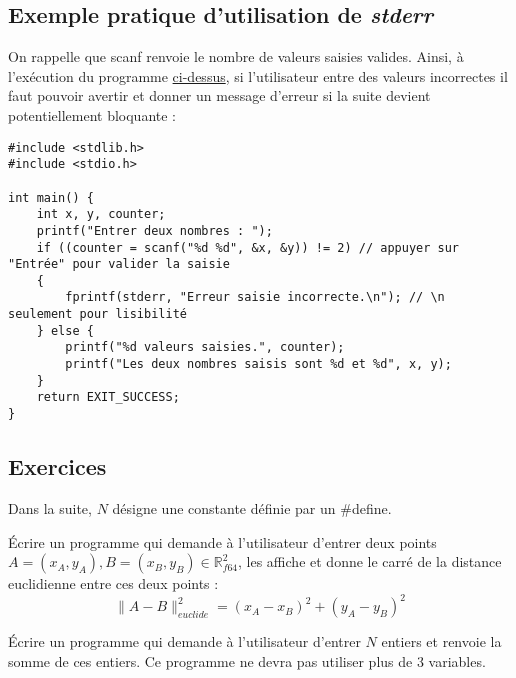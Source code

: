 \documentclass[../../../main.tex]{subfiles}
\begin{document}
\subsection{Exemple pratique d'utilisation de \textit{stderr}}
On rappelle que \textsf{scanf} renvoie le nombre de valeurs saisies valides. Ainsi, à l'exécution du programme \hyperref[lst:prgm1]{ci-dessus}{}, si l'utilisateur entre des valeurs incorrectes il faut pouvoir avertir et donner un message d'erreur si la suite devient potentiellement bloquante :
	\begin{verbatim}
#include <stdlib.h>
#include <stdio.h>

int main() {
	int x, y, counter;
	printf("Entrer deux nombres : ");
	if ((counter = scanf("%d %d", &x, &y)) != 2) // appuyer sur "Entrée" pour valider la saisie
	{
		fprintf(stderr, "Erreur saisie incorrecte.\n"); // \n seulement pour lisibilité
	} else {
		printf("%d valeurs saisies.", counter);
		printf("Les deux nombres saisis sont %d et %d", x, y);
	}
	return EXIT_SUCCESS;
}
	\end{verbatim}
\subsection{Exercices}
Dans la suite, $N$ désigne une constante définie par un \textsf{\#define}.

Écrire un programme qui demande à l'utilisateur d'entrer deux points $A = (x_{A}, y_{A}), B = (x_{B}, y_{B})\in{\mathbb{R}_{f64}^{2}}$, les affiche et donne le carré de la distance euclidienne entre ces deux points :
$$\lVert{A - B}\rVert^{2}_{euclide} = (x_{A} - x_{B})^{2} + (y_{A} - y_{B})^{2}$$

Écrire un programme qui demande à l'utilisateur d'entrer $N$ entiers et renvoie la somme de ces entiers. Ce programme ne devra pas utiliser plus de 3 variables.
\end{document}

